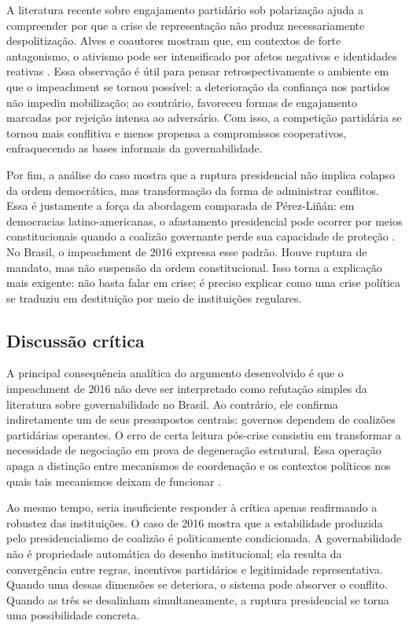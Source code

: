 \documentclass[12pt,a4paper]{article}
\begin{document}
A literatura recente sobre engajamento partidário sob polarização ajuda a compreender por que a crise de representação não produz necessariamente despolitização. Alves e coautores mostram que, em contextos de forte antagonismo, o ativismo pode ser intensificado por afetos negativos e identidades reativas \textcite{alves2024_rage_within}. Essa observação é útil para pensar retrospectivamente o ambiente em que o impeachment se tornou possível: a deterioração da confiança nos partidos não impediu mobilização; ao contrário, favoreceu formas de engajamento marcadas por rejeição intensa ao adversário. Com isso, a competição partidária se tornou mais conflitiva e menos propensa a compromissos cooperativos, enfraquecendo as bases informais da governabilidade.

Por fim, a análise do caso mostra que a ruptura presidencial não implica colapso da ordem democrática, mas transformação da forma de administrar conflitos. Essa é justamente a força da abordagem comparada de Pérez-Liñán: em democracias latino-americanas, o afastamento presidencial pode ocorrer por meios constitucionais quando a coalizão governante perde sua capacidade de proteção \textcite{perez_lian2016_explaining_military}. No Brasil, o impeachment de 2016 expressa esse padrão. Houve ruptura de mandato, mas não suspensão da ordem constitucional. Isso torna a explicação mais exigente: não basta falar em crise; é preciso explicar como uma crise política se traduziu em destituição por meio de instituições regulares.

\subsection{Discussão crítica}
\label{sec:org0c3c1b6}
A principal consequência analítica do argumento desenvolvido é que o impeachment de 2016 não deve ser interpretado como refutação simples da literatura sobre governabilidade no Brasil. Ao contrário, ele confirma indiretamente um de seus pressupostos centrais: governos dependem de coalizões partidárias operantes. O erro de certa leitura pós-crise consistiu em transformar a necessidade de negociação em prova de degeneração estrutural. Essa operação apaga a distinção entre mecanismos de coordenação e os contextos políticos nos quais tais mecanismos deixam de funcionar \textcite{limongi2017_a_crise}.

Ao mesmo tempo, seria insuficiente responder à crítica apenas reafirmando a robustez das instituições. O caso de 2016 mostra que a estabilidade produzida pelo presidencialismo de coalizão é politicamente condicionada. A governabilidade não é propriedade automática do desenho institucional; ela resulta da convergência entre regras, incentivos partidários e legitimidade representativa. Quando uma dessas dimensões se deteriora, o sistema pode absorver o conflito. Quando as três se desalinham simultaneamente, a ruptura presidencial se torna uma possibilidade concreta.
\end{document}
